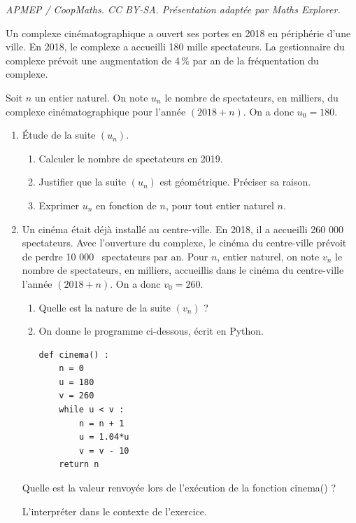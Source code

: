 \documentclass[10pt]{article}
\providecommand{\np}[2][]{{#2~#1}}
\begin{document}
\noindent\textit{APMEP / CoopMaths. CC BY-SA. Présentation adaptée par Maths Explorer.}\par\medskip
\medskip

Un complexe cinématographique a ouvert ses portes en 2018 en périphérie d'une ville.
En 2018, le complexe a accueilli 180 mille spectateurs. La gestionnaire du complexe prévoit une augmentation de 4\,\% par an de la fréquentation du complexe.

Soit $n$ un entier naturel. On note $u_n$ le nombre de spectateurs, en milliers, du complexe cinématographique pour l'année $(2018+n)$. On a donc $u_0=180$.

\medskip

\begin{enumerate}
\item  Étude de la suite $\left(u_n\right)$.
	\begin{enumerate}
		\item  Calculer le nombre de spectateurs en 2019.
		\item Justifier que la suite $\left(u_n\right)$ est géométrique. Préciser sa raison.
		\item Exprimer $u_n$ en fonction de $n$, pour tout entier naturel $n$.
	\end{enumerate}
\item Un cinéma était déjà installé au centre-ville. En 2018, il a accueilli \np{260 000} spectateurs. Avec l'ouverture du complexe, le cinéma du centre-ville prévoit de perdre \np{10 000} spectateurs par an.
Pour $n$, entier naturel, on note $v_n$ le nombre de spectateurs, en milliers, accueillis dans le cinéma du centre-ville l'année $(2018 + n)$. On a donc $v_0 = 260$.
	\begin{enumerate}
		\item Quelle est la nature de la suite $\left(v_n\right)$ ?
		\item On donne le programme ci-dessous, écrit en Python.

\begin{lstlisting}[style=python]
def cinema() :
	n = 0
	u = 180
	v = 260
	while u < v :
		n = n + 1
		u = 1.04*u
		v = v - 10
	return n
\end{lstlisting}
	\end{enumerate}
Quelle est la valeur renvoyée lors de l'exécution de la fonction cinema() ? 

L'interpréter dans le contexte de l'exercice.
\end{enumerate}

\vspace{0,5cm}
\end{document}

